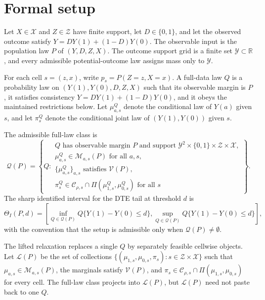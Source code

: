 \documentclass[11pt]{article}
\theoremstyle{definition}
\theoremstyle{plain}
\theoremstyle{remark}
\begin{document}
\section{Formal setup}
Let \(X\in\mathcal X\) and \(Z\in\mathcal Z\) have finite support, let \(D\in\{0,1\}\), and let the observed outcome satisfy \(Y=DY(1)+(1-D)Y(0)\).  The observable input is the population law \(P\) of \((Y,D,Z,X)\).  The outcome support grid is a finite set \(\mathcal Y\subset\mathbb R\), and every admissible potential-outcome law assigns mass only to \(\mathcal Y\).

For each cell \(s=(z,x)\), write \(p_s=P(Z=z,X=x)\).  A full-data law \(Q\) is a probability law on \((Y(1),Y(0),D,Z,X)\) such that its observable margin is \(P\), it satisfies consistency \(Y=DY(1)+(1-D)Y(0)\), and it obeys the maintained restrictions below.  Let \(\mu_{a,s}^Q\) denote the conditional law of \(Y(a)\) given \(s\), and let \(\pi_s^Q\) denote the conditional joint law of \((Y(1),Y(0))\) given \(s\).

The admissible full-law class is
\[
\mathcal Q(P)=\left\{Q:
\begin{array}{l}
Q \text{ has observable margin }P\text{ and support }\mathcal Y^2\times\{0,1\}\times\mathcal Z\times\mathcal X,\\
\mu_{a,s}^Q\in\mathcal M_{a,s}(P)\text{ for all }a,s,\\
\{\mu_{a,s}^Q\}_{a,s}\text{ satisfies }\mathcal V(P),\\
\pi_s^Q\in\mathcal C_{\rho,s}\cap\Pi(\mu_{1,s}^Q,\mu_{0,s}^Q)\text{ for all }s
\end{array}
\right\}.
\]
The sharp identified interval for the DTE tail at threshold \(d\) is
\[
\Theta_I(P,d)=
\left[
\inf_{Q\in\mathcal Q(P)} Q\{Y(1)-Y(0)\le d\},
\sup_{Q\in\mathcal Q(P)} Q\{Y(1)-Y(0)\le d\}
\right],
\]
with the convention that the setup is admissible only when \(\mathcal Q(P)\neq\emptyset\).

The lifted relaxation replaces a single \(Q\) by separately feasible cellwise objects.  Let \(\mathcal L(P)\) be the set of collections \(\{(\mu_{1,s},\mu_{0,s},\pi_s):s\in\mathcal Z\times\mathcal X\}\) such that \(\mu_{a,s}\in\mathcal M_{a,s}(P)\), the marginals satisfy \(\mathcal V(P)\), and \(\pi_s\in\mathcal C_{\rho,s}\cap\Pi(\mu_{1,s},\mu_{0,s})\) for every cell.  The full-law class projects into \(\mathcal L(P)\), but \(\mathcal L(P)\) need not paste back to one \(Q\).
\end{document}
